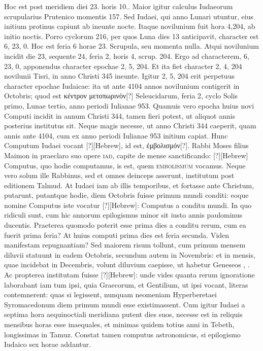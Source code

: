 Hoc est post meridiem
diei 23. horis 10..
Maior igitur calculus Iudaeorum scrupularius
Prutenico momentis 157.
Sed Iudaei, qui anno Lunari utuntur, eius
initium protinus capiunt ab ineunte nocte.
Itaque novilunium fuit hora
4,204, ab initio noctis.
Porro cyclorum 216, per quos Luna dies 13
anticipavit, character est 6, 23, 0.
Hoc est feria 6 horae 23.
Scrupula, seu
momenta nulla.
Atqui novilunium incidit die 23, sequente 24, feria
2, horis 4, scrup. 204. %
Ergo ad characterem, 6, 23, 0, apponendus character
epochae 2, 5, 204.
Et ita fiet character 2, 4, 204 novilunii
Tisri, in anno Christi 345 ineunte.
Igitur 2, 5, 204 erit perpetuus character
epochae Iudaicae: ita ut ante 4104 annos novilunium contigerit
in  Octobris; quod est \textgreek{κέντρον μετοπωρινὸν[?]}
 Seleucidarum, feria 2,
cyclo Solis primo, Lunae tertio, anno periodi Iulianae 953.
Quamuis
vero epocha huius novi Computi incidit in annum Christi 344, tamen
fieri potest, ut aliquot annis posterius institutus sit.
Neque magis necesse,
ut anno Christi 344 caeperit, quam annis ante 4104, cum ex anno
periodi Iulianae 953 initium capiat.
Hunc Computum Iudaei vocant
\texthebrew{[?]}[Hebrew], id est, \textgreek{ἐμβολισμόν[?]}.
Rabbi Moses filius Maimon in praeclaro suo
opere \textsc{iad}, capite de mense sanctificando:
\texthebrew{[?]}[Hebrew] Computus, quo hodie computamus,
 is est, quem \textsc{embolismum}
vocamus.
Neque vero solum ille Rabbinus, sed et omnes
deinceps asserunt, institutum post editionem Talmud.
At Iudaei iam
ab illis temporibus, et fortasse ante Christum, putarunt, putantque
hodie, diem  Octobris fuisse primum mundi conditi: eoque nomine
Computus iste vocatur \texthebrew{[?]}[Hebrew]:
Computus a conditu mundi.
In quo ridiculi sunt, cum hic annorum epilogismus minor
sit iusto annis paulominus ducentis.
Praeterea quomodo poterit
esse prima dies a conditu rerum, cum ea fuerit prima feria?
At huius
computi prima dies est feria secunda.
Viden manifestam repugnantiam?
Sed maiorem risum tollunt, cum primum mensem diluvii
statuunt in eadem  Octobris, secundum autem in  Novembris:
et in  mensis, quae incidebat in  Decembris, volunt
diluvium caepisse, ut habetur Geneseos , .
Ac propterea institutam
fuisse \texthebrew{[?]}[Hebrew]: unde vides quanta rerum ignoratione laborabant
iam tum ipsi, quia Graecorum, et Gentilium, ut ipsi vocant, literas
contemnerent: quas si legissent, nunquam neomeniam Hyperberetaei
Syromacedonum diem primum mundi esse existimassent.
Cum igitur Iudaei a septima hora aequinoctiali meridiana putent dies
suos, necesse est in reliquis mensibus horas esse inaequales, et minimas
quidem totius anni in Tebeth, longissimas in Tamuz.
Constat
tamen computus astronomicus, si epilogismo Iudaico sex horae
addantur.

